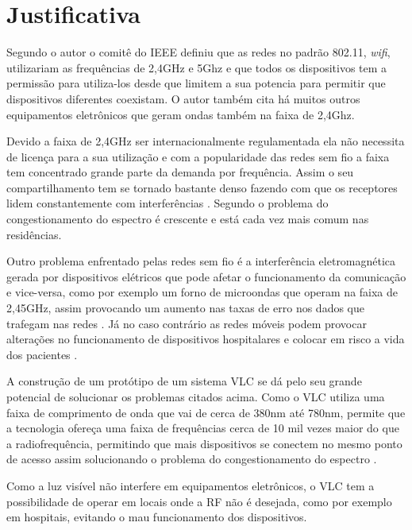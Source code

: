 \chapter{Justificativa}

Segundo o autor  o comitê do IEEE definiu que as redes no padrão 802.11, \textit{wifi}, utilizariam as frequências de 2,4GHz e 5Ghz e que todos os dispositivos tem a permissão para utiliza-los desde que limitem a sua potencia para permitir que dispositivos diferentes coexistam. O autor  também cita há muitos outros equipamentos eletrônicos que geram ondas também na faixa de 2,4Ghz. 

Devido a faixa de 2,4GHz ser internacionalmente regulamentada ela não necessita de licença para a sua utilização e com a popularidade das redes sem fio a faixa tem concentrado grande parte da demanda por frequência. Assim o seu compartilhamento tem se tornado bastante denso fazendo com que os receptores lidem constantemente com interferências \cite{barros}. Segundo  o problema do congestionamento do espectro é crescente e está cada vez mais comum nas residências.

Outro problema enfrentado pelas redes sem fio é a interferência eletromagnética gerada por dispositivos elétricos que pode afetar o funcionamento da comunicação e vice-versa, como por exemplo um forno de microondas que operam na faixa de 2,45GHz, assim provocando um aumento nas taxas de erro nos dados que trafegam nas redes \cite{barros}. Já no caso contrário as redes móveis podem provocar alterações no funcionamento de dispositivos hospitalares e colocar em risco a vida dos pacientes \cite{cabral}.

A construção de um protótipo de um sistema VLC se dá pelo seu grande potencial de solucionar os problemas citados acima. Como o VLC utiliza uma faixa de comprimento de onda que vai de cerca de 380nm até 780nm, permite que a tecnologia ofereça uma faixa de frequências cerca de 10 mil vezes maior do que a radiofrequência, permitindo que mais dispositivos se conectem no mesmo ponto de acesso assim solucionando o problema do congestionamento do espectro \cite{conceiccao2015comunicaccao}. 

Como a luz visível não interfere em equipamentos eletrônicos, o VLC tem a possibilidade de operar  em locais onde a RF não é desejada, como por exemplo em hospitais, evitando o mau funcionamento dos dispositivos.

